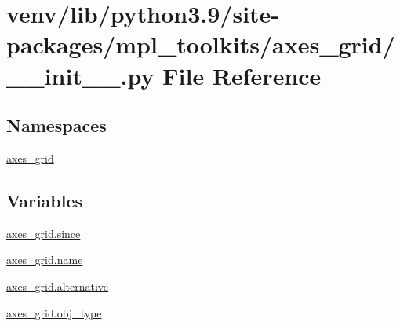 \hypertarget{venv_2lib_2python3_89_2site-packages_2mpl__toolkits_2axes__grid_2____init_____8py}{}\section{venv/lib/python3.9/site-\/packages/mpl\+\_\+toolkits/axes\+\_\+grid/\+\_\+\+\_\+init\+\_\+\+\_\+.py File Reference}
\label{venv_2lib_2python3_89_2site-packages_2mpl__toolkits_2axes__grid_2____init_____8py}
\subsection*{Namespaces}
\begin{DoxyCompactItemize}
\item 
 \hyperlink{namespaceaxes__grid}{axes\+\_\+grid}
\end{DoxyCompactItemize}
\subsection*{Variables}
\begin{DoxyCompactItemize}
\item 
\hyperlink{namespaceaxes__grid_a3d4be314910495afdb19dadd821c65ba}{axes\+\_\+grid.\+since}
\item 
\hyperlink{namespaceaxes__grid_a766b3b6327c34071a8dd2ea7af4982f8}{axes\+\_\+grid.\+name}
\item 
\hyperlink{namespaceaxes__grid_a34b85bbc09a3883041090eaa041fa001}{axes\+\_\+grid.\+alternative}
\item 
\hyperlink{namespaceaxes__grid_a98224bbadbb3e17faee0f19ef46fc85a}{axes\+\_\+grid.\+obj\+\_\+type}
\end{DoxyCompactItemize}
